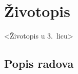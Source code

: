 % 

      \chapter*{Životopis}
     
     <Životopis u 3.~licu>
     


      
      \section*{Popis radova}
      



